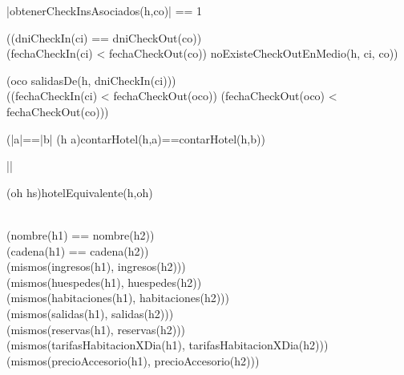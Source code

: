 {
  |obtenerCheckInsAsociados(h,co)| == 1
}

\vspace{0.2cm}

{
}

\vspace{0.2cm}

{
    ((dniCheckIn(ci) == dniCheckOut(co)) \land
    \\(fechaCheckIn(ci) < fechaCheckOut(co)) \land noExisteCheckOutEnMedio(h, ci, co))
}

\vspace{0.2cm}

{
	\lnot(\exists oco \selec salidasDe(h, dniCheckIn(ci)))\\
	((fechaCheckIn(ci) < fechaCheckOut(oco)) \land (fechaCheckOut(oco) < fechaCheckOut(co)))
}

\vspace{0.2cm}

{
	(|a|==|b| \land (\forall h \selec a)contarHotel(h,a)==contarHotel(h,b))
}

\vspace{0.2cm}

{
	||
}

\vspace{0.2cm}

{
	(\exists oh \selec hs)hotelEquivalente(h,oh)
}

\vspace{0.2cm}

{
	\\ (nombre(h1) == nombre(h2)) \land \\
	(cadena(h1) == cadena(h2)) \land \\
	(mismos(ingresos(h1), ingresos(h2))) \land \\
	(mismos(huespedes(h1), huespedes(h2)) \land \\
	(mismos(habitaciones(h1), habitaciones(h2))) \land \\
	(mismos(salidas(h1), salidas(h2))) \land \\
	(mismos(reservas(h1), reservas(h2))) \land \\
	(mismos(tarifasHabitacionXDia(h1), tarifasHabitacionXDia(h2))) \land \\
	(mismos(precioAccesorio(h1), precioAccesorio(h2)))
}

